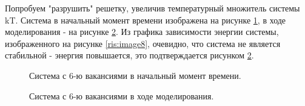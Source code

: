 \documentclass[14pt,a4paper,report]{ncc}
\begin{document}
Попробуем "разрушить" решетку, увеличив температурный множитель системы kT. Система в начальный момент времени изображена на рисунке \ref{ris:image6}, в ходе моделирования - на рисунке \ref{ris:image7}. Из графика зависимости энергии системы, изображенного на рисунке \ref{ris:image8}, очевидно, что система не является стабильной - энергия повышается, это подтверждается рисунком \ref{ris:image7}.
\begin{figure}[h]
\caption{Система с 6-ю вакансиями в начальный момент времени.}
\label{ris:image6}
\end{figure}
\begin{figure}[h]
\caption{Система с 6-ю вакансиями в ходе моделирования.}
\label{ris:image7}
\end{figure}
\end{document}

